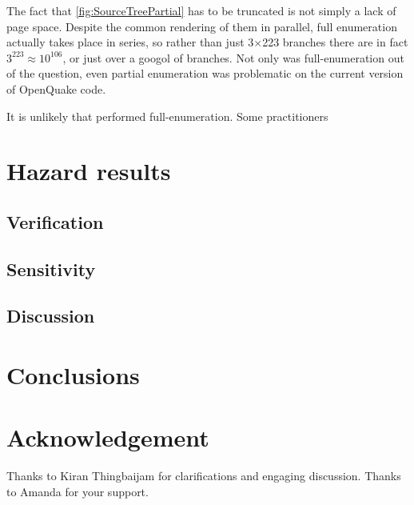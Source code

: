 \documentclass{article}
\begin{document}
The fact that \autoref{fig:SourceTreePartial} has to be truncated is not simply a lack of page space. Despite the common rendering of them in parallel, full enumeration actually takes place in series, so rather than just 3$\times$223 branches there are in fact $3^{223} \approx 10^106$, or just over a googol of branches. Not only was full-enumeration out of the question, even partial enumeration was problematic on the current version of OpenQuake code.

It is unlikely that \cite{nath2012probabilistic} performed full-enumeration. Some practitioners 

\section{Hazard results}
\label{sec:Results}

\subsection{Verification}
\label{subsec:Verification}

\subsection{Sensitivity}
\label{subsec:Sensitivity}

\subsection{Discussion}
\label{subsec:Discussion}

\section{Conclusions}
\label{sec:Conclusions}

\section*{Acknowledgement}
Thanks to Kiran Thingbaijam for clarifications and engaging discussion. Thanks to Amanda for your support.

\cleardoublepage
{}
{}


\end{document}
